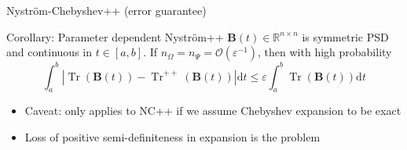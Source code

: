 \documentclass[aspectratio=169, leqno, 12pt]{beamer}
\newcommand{\mtx}[1]{\boldsymbol{#1}}
\DeclareMathOperator{\Tr}{Tr}
\begin{document}
\begin{frame}{Nystr\"om-Chebyshev++ (error guarantee)}
    \begin{block}{Corollary: Parameter dependent Nystr\"om++}
        $\mtx{B}(t) \in \mathbb{R}^{n \times n}$ is symmetric \gls{PSD}
        and continuous in $t \in [a, b]$. If $n_{\Omega} = n_{\Psi} = \mathcal{O}\left( \varepsilon^{-1} \right)$,
        then with high probability
        \begin{equation}
            \int_{a}^{b} |\Tr(\mtx{B}(t)) - \Tr^{++}(\mtx{B}(t))| \mathrm{d}t \leq \varepsilon \int_{a}^{b}\Tr(\mtx{B}(t)) \mathrm{d}t
        \end{equation}
    \end{block}
    \begin{itemize}
        \item Caveat: only applies to NC++ if we assume Chebyshev expansion to be exact
        \item Loss of positive semi-definiteness in expansion is the problem
    \end{itemize}
\end{frame}
\end{document}
